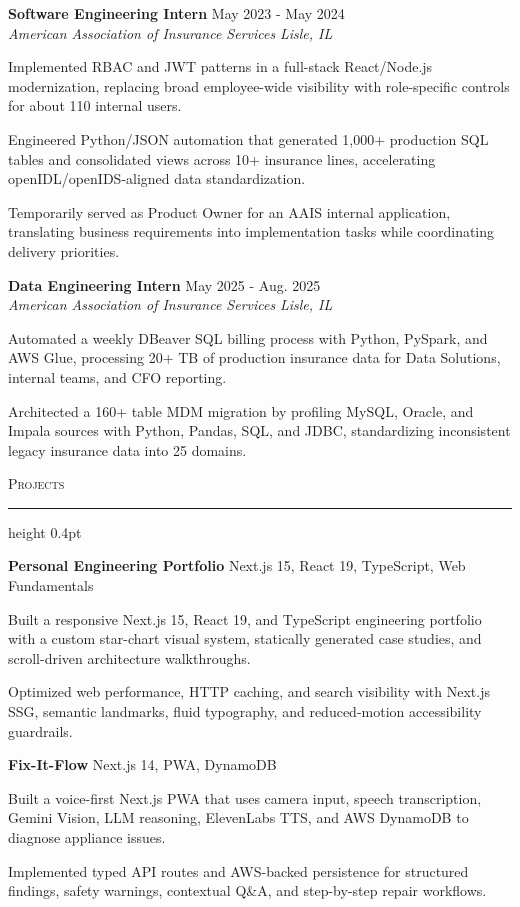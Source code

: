 \documentclass[letterpaper,11pt]{article}
\newcommand{\resumesection}[1]{%
  \par\vspace{2pt}%
  {\large\scshape #1}\par\vspace{2pt}%
  \hrule height 0.4pt\vspace{2pt}%
}
\newcommand{\resumeSubheading}[4]{
  \textbf{#1} \hfill #2\\
  \textit{#3} \hfill \textit{#4}
}
\newcommand{\projectHeading}[2]{
  \textbf{#1} \hfill #2
}
\begin{document}
\resumeSubheading
{Software Engineering Intern}{May 2023 - May 2024}
{American Association of Insurance Services}{Lisle, IL}
\begin{tightitemize}
  \item Implemented RBAC and JWT patterns in a full-stack React/Node.js modernization, replacing broad employee-wide visibility with role-specific controls for about 110 internal users.
  \item Engineered Python/JSON automation that generated 1,000+ production SQL tables and consolidated views across 10+ insurance lines, accelerating openIDL/openIDS-aligned data standardization.
  \item Temporarily served as Product Owner for an AAIS internal application, translating business requirements into implementation tasks while coordinating delivery priorities.
\end{tightitemize}

\resumeSubheading
{Data Engineering Intern}{May 2025 - Aug. 2025}
{American Association of Insurance Services}{Lisle, IL}
\begin{tightitemize}
  \item Automated a weekly DBeaver SQL billing process with Python, PySpark, and AWS Glue, processing 20+ TB of production insurance data for Data Solutions, internal teams, and CFO reporting.
  \item Architected a 160+ table MDM migration by profiling MySQL, Oracle, and Impala sources with Python, Pandas, SQL, and JDBC, standardizing inconsistent legacy insurance data into 25 domains.
\end{tightitemize}

\resumesection{Projects}
\projectHeading{Personal Engineering Portfolio}{Next.js 15, React 19, TypeScript, Web Fundamentals}
\begin{tightitemize}
  \item Built a responsive Next.js 15, React 19, and TypeScript engineering portfolio with a custom star-chart visual system, statically generated case studies, and scroll-driven architecture walkthroughs.
  \item Optimized web performance, HTTP caching, and search visibility with Next.js SSG, semantic landmarks, fluid typography, and reduced-motion accessibility guardrails.
\end{tightitemize}

\projectHeading{Fix-It-Flow}{Next.js 14, PWA, DynamoDB}
\begin{tightitemize}
  \item Built a voice-first Next.js PWA that uses camera input, speech transcription, Gemini Vision, LLM reasoning, ElevenLabs TTS, and AWS DynamoDB to diagnose appliance issues.
  \item Implemented typed API routes and AWS-backed persistence for structured findings, safety warnings, contextual Q\&A, and step-by-step repair workflows.
\end{tightitemize}
\end{document}
